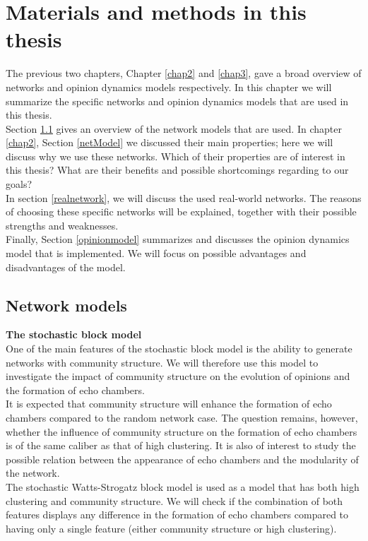 \documentclass[11 pt , letterpaper , twoside , openright]{book}
\begin{document}
\chapter{Materials and methods in this thesis}\label{chap4}

The previous two chapters, Chapter \ref{chap2} and \ref{chap3}, gave a broad overview of networks and opinion dynamics models respectively. In this chapter we will summarize the specific networks and opinion dynamics models that are used in this thesis. \\
\newline
Section \ref{networkmodel} gives an overview of the network models that are used. In chapter \ref{chap2}, Section \ref{netModel} we discussed their main properties; here we will discuss why we use these networks. Which of their properties are of interest in this thesis? What are their benefits and possible shortcomings regarding to our goals?\\
\newline
In section \ref{realnetwork}, we will discuss the used real-world networks. The reasons of choosing these specific networks will be explained, together with their possible strengths and weaknesses.\\ %
\newline
Finally, Section \ref{opinionmodel} summarizes and discusses the opinion dynamics model that is implemented. We will focus on possible advantages and disadvantages of the model.


\section{Network models}\label{networkmodel}

\textbf{The stochastic block model}\\
\newline
One of the main features of the stochastic block model is the ability to generate networks with community structure. We will therefore use this model to investigate the impact of community structure on the evolution of opinions and the formation of echo chambers.\\
\newline
It is expected that community structure will enhance the formation of echo chambers compared to the random network case. The question remains, however, whether the influence of community structure on the formation of echo chambers is of the same caliber as that of high clustering. It is also of interest to study the possible relation between the appearance of echo chambers and the modularity of the network.\\
\newline
The stochastic Watts-Strogatz block model is used as a model that has both high clustering and community structure. We will check if the combination of both features displays any difference in the formation of echo chambers compared to having only a single feature (either community structure or high clustering).
\end{document}
